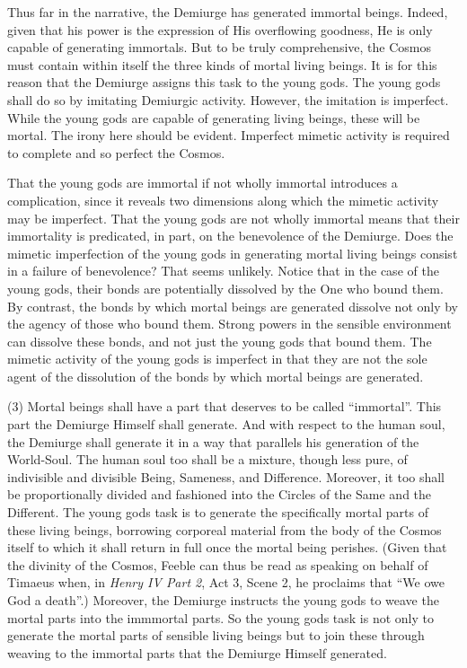 Thus far in the narrative, the Demiurge has generated immortal beings. Indeed, given that his power is the expression of His overflowing goodness, He is only capable of generating immortals. But to be truly comprehensive, the Cosmos must contain within itself the three kinds of mortal living beings. It is for this reason that the Demiurge assigns this task to the young gods. The young gods shall do so by imitating Demiurgic activity. However, the imitation is imperfect. While the young gods are capable of generating living beings, these will be mortal. The irony here should be evident. Imperfect mimetic activity is required to complete and so perfect the Cosmos.

That the young gods are immortal if not wholly immortal introduces a complication, since it reveals two dimensions along which the mimetic activity may be imperfect. That the young gods are not wholly immortal means that their immortality is predicated, in part, on the benevolence of the Demiurge. Does the mimetic imperfection of the young gods in generating mortal living beings consist in a failure of benevolence? That seems unlikely. Notice that in the case of the young gods, their bonds are potentially dissolved by the One who bound them. By contrast, the bonds by which mortal beings are generated dissolve not only by the agency of those who bound them. Strong powers in the sensible environment can dissolve these bonds, and not just the young gods that bound them. The mimetic activity of the young gods is imperfect in that they are not the sole agent of the dissolution of the bonds by which mortal beings are generated.

(3) Mortal beings shall have a part that deserves to be called ``immortal''. This part the Demiurge Himself shall generate. And with respect to the human soul, the Demiurge shall generate it in a way that parallels his generation of the World-Soul. The human soul too shall be a mixture, though less pure, of indivisible and divisible Being, Sameness, and Difference. Moreover, it too shall be proportionally divided and fashioned into the Circles of the Same and the Different. The young gods task is to generate the specifically mortal parts of these living beings, borrowing corporeal material from the body of the Cosmos itself to which it shall return in full once the mortal being perishes. (Given that the divinity of the Cosmos, Feeble can thus be read as speaking on behalf of Timaeus when, in \emph{Henry IV Part 2}, Act 3, Scene 2, he proclaims that ``We owe God a death''.) Moreover, the Demiurge instructs the young gods to weave the mortal parts into the immmortal parts. So the young gods task is not only to generate the mortal parts of sensible living beings but to join these through weaving to the immortal parts that the Demiurge Himself generated.

